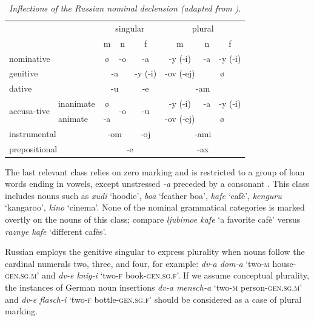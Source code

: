 \begin{table}
	\begin{tabularx}{.81\textwidth}{l l c c c@{\hskip 20pt} c c c}
	    \midrule
		\multicolumn{2}{c}{} & \multicolumn{3}{c}{singular} & \multicolumn{3}{c}{plural}\\ \cline{3-8}
		\multicolumn{2}{c}{} & m & n & f & m & n & f\\ \midrule
		\multicolumn{2}{l}{nominative} & \o & -o & -a & -y (-i) & -a & -y (-i)\\ \midrule
		\multicolumn{2}{l}{genitive} & \multicolumn{2}{c}{-a} & -y (-i) & -ov (-ej) & \multicolumn{2}{c}{\o}\\ \midrule
		\multicolumn{2}{l}{dative} & \multicolumn{2}{c}{-u} & -e & \multicolumn{3}{c}{-am}\\ \midrule
		\multirow{2}{28pt}{accusa-tive} & inanimate & \o & \multirow{2}{*}{-o} & \multirow{2}{*}{-u} & -y (-i) & -a & -y (-i)\\ \cline{2-3} \cline{6-8}
		& animate & -a & & & -ov (-ej) & \multicolumn{2}{c}{\o}\\ \midrule
		\multicolumn{2}{l}{instrumental} & \multicolumn{2}{c}{-om} & -oj & \multicolumn{3}{c}{-ami}\\ \midrule
		\multicolumn{2}{l}{prepositional} & \multicolumn{3}{c}{-e} & \multicolumn{3}{c}{-ax}\\ \midrule			 
	\end{tabularx}

	\caption{\textit{Inflections of the Russian nominal declension (adapted from \citealt[26]{zaliznjak09})}.}
\label{tab:6:1}
\end{table}

The last relevant class relies on zero marking and is restricted to a group of loan words ending in vowels, except unstressed \textit{-a} preceded by a consonant \citep[148--149]{timberlake04}. This class includes nouns such as \textit{xudi} ‘hoodie’, \textit{boa} `feather boa', \textit{kafe} `cafè', \textit{kenguru} `kangaroo', \textit{kino} `cinema'. None of the nominal grammatical categories is marked overtly on the nouns of this class; compare \textit{ljubimoe kafe} `a favorite cafè' versus \textit{raznye kafe} `different cafès'.

Russian employs the genitive singular to express plurality when nouns follow the cardinal numerals two, three, and four, for example: \textit{dv-a dom-a} `two-\textsc{m} house-\textsc{gen.sg.m}' and \textit{dv-e knig-i} `two-\textsc{f} book-\textsc{gen.sg.f}'. If we assume conceptual plurality, the instances of German noun insertions \textit{dv-a mensch-a} `two-\textsc{m} person-\textsc{gen.sg.m}' and \textit{dv-e flasch-i} `two-\textsc{f} bottle-\textsc{gen.sg.f}' should be considered as a case of plural marking.

